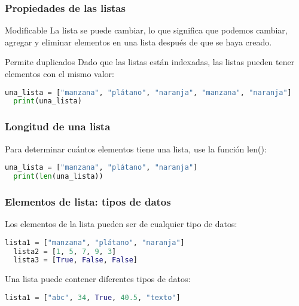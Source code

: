 \begin{frame}[fragile]
  \frametitle{Propiedades de las listas}

  \begin{block}{Modificable}
    La lista se puede cambiar, lo que significa que podemos cambiar,
    agregar y eliminar elementos en una lista después de que se haya creado.
  \end{block}

  \pausa
  \begin{block}{Permite duplicados}
    Dado que las listas están indexadas, las listas pueden tener
    elementos con el mismo valor: 
  \end{block}

  \vspace{\baselineskip}
  \begin{lstlisting}[language=Python]
  una_lista = ["manzana", "plátano", "naranja", "manzana", "naranja"]
  print(una_lista) 
  \end{lstlisting}
\end{frame}

\begin{frame}[fragile]
  \frametitle{Longitud de una lista}

  Para determinar cuántos elementos tiene una lista, use la función
  \textcolor{codeKeyword}{len}():

  \vspace{\baselineskip}
  \begin{lstlisting}[language=Python]
  una_lista = ["manzana", "plátano", "naranja"]
  print(len(una_lista)) 
  \end{lstlisting}
\end{frame}

\begin{frame}[fragile]
  \frametitle{Elementos de lista: tipos de datos}

  Los elementos de la lista pueden ser de cualquier tipo de datos:

  \vspace{\baselineskip}
  \begin{lstlisting}[language=Python]
  lista1 = ["manzana", "plátano", "naranja"]
  lista2 = [1, 5, 7, 9, 3]
  lista3 = [True, False, False]
  \end{lstlisting}

  \pausa
  Una lista puede contener diferentes tipos de datos:
  \vspace{\baselineskip}
  \begin{lstlisting}[language=Python]
  lista1 = ["abc", 34, True, 40.5, "texto"]
  \end{lstlisting}
\end{frame}

